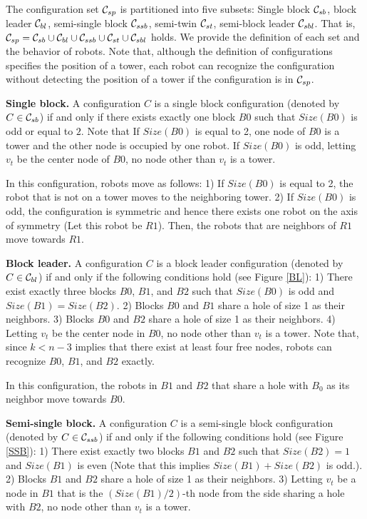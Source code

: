 \documentclass[11pt]{article}
\newcommand{\CONF}{{\cal C}}
\begin{document}
The configuration set $\CONF_{sp}$ is partitioned into five subsets: Single block $\CONF_{sb}$, block leader $\CONF_{bl}$, semi-single block $\CONF_{ssb}$, semi-twin $\CONF_{st}$, semi-block leader $\CONF_{sbl}$. That is, $\CONF_{sp}=\CONF_{sb}\cup\CONF_{bl}\cup\CONF_{ssb}\cup\CONF_{st}\cup\CONF_{sbl}$ holds. We provide the definition of each set and the behavior of robots. Note that, although the definition of configurations specifies the position of a tower, each robot can recognize the configuration without detecting the position of a tower if the configuration is in $\CONF_{sp}$.
\begin{itemize*}
\item {\bf Single block.} A configuration $C$ is a single block configuration (denoted by $C\in\CONF_{sb}$) if and only if there exists exactly one block $B0$ such that $Size(B0)$ is odd or equal to $2$. Note that If $Size(B0)$ is equal to 2, one node of $B0$ is a tower and the other node is occupied by one robot. If $Size(B0)$ is odd, letting $v_t$ be the center node of $B0$, no node other than $v_t$ is a tower.



In this configuration, robots move as follows: 1) If $Size(B0)$ is equal to 2, the robot that is not on a tower moves to the neighboring tower. 2) If $Size(B0)$ is odd, the configuration is symmetric and hence there exists one robot on the axis of symmetry (Let this robot be $R1$). Then, the robots that are neighbors of $R1$ move towards $R1$.

\item {\bf Block leader.} A configuration $C$ is a block leader configuration (denoted by $C\in\CONF_{bl}$) if and only if the following conditions hold (see Figure \ref{BL}): 1) There exist exactly three blocks $B0$, $B1$, and $B2$ such that $Size(B0)$ is odd and $Size(B1)=Size(B2)$. 2) Blocks $B0$ and $B1$ share a hole of size 1 as their neighbors. 3) Blocks $B0$ and $B2$ share a hole of size 1 as their neighbors. 4) Letting $v_t$ be the center node in $B0$, no node other than $v_t$ is a tower. Note that, since $k<n-3$ implies that there exist at least four free nodes, robots can recognize $B0$, $B1$, and $B2$ exactly.

In this configuration, the robots in $B1$ and $B2$ that share a hole with $B_0$ as its neighbor move towards $B0$.

\item {\bf Semi-single block.} A configuration $C$ is a semi-single block configuration (denoted by $C\in\CONF_{ssb}$) if and only if the following conditions hold (see Figure \ref{SSB}): 1) There exist exactly two blocks $B1$ and $B2$ such that $Size(B2)=1$ and $Size(B1)$ is even (Note that this implies $Size(B1)+Size(B2)$ is odd.). 2) Blocks $B1$ and $B2$ share a hole of size 1 as their neighbors. 3) Letting $v_t$ be a node in $B1$ that is the $(Size(B1)/2)$-th node from the side sharing a hole with $B2$, no node other than $v_t$ is a tower.


\end{itemize*}
\end{document}

